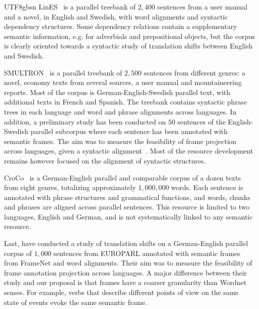 \documentclass[12pt]{book} %
\begin{document}
\begin{CJK}{UTF8}{gbsn}
LinES~\citep{ahrenberg2007lines} is a parallel treebank of $2,400$
sentences from a user manual and a novel, in English and Swedish, with
word alignments and syntactic dependency structures.
Some dependency relations contain a supplementary semantic
information, e.g. for adverbials and prepositional objects, but the
corpus is clearly oriented towards a syntactic study of translation
shifts between English and Swedish.

SMULTRON~\citep{Smultron2010} is a parallel treebank of $2,500$
sentences from different genres: a novel, economy texts from several
sources, a user manual and mountaineering reports.
Most of the corpus is German-English-Swedish parallel text, with
additional texts in French and Spanish.
The treebank contains syntactic phrase trees in each language and word
and phrase alignments across languages.
In addition, a preliminary study has been conducted on $50$ sentences
of the English-Swedish parallel subcorpus where each sentence has been
annotated with semantic frames.
The aim was to measure the feasibility of frame projection across
languages, given a syntactic alignment~\citep{Volk:Samuelsson:2007}.
Most of the resource development remains however focused on the
alignment of syntactic structures.

CroCo~\citep{vculo2008empirical} is a German-English parallel and
comparable corpus of a dozen texts from eight genres, totalizing
approximately $1,000,000$ words.
Each sentence is annotated with phrase structures and grammatical
functions, and words, chunks and phrases are aligned across parallel
sentences.
This resource is limited to two languages, English and German, and is
not systematically linked to any semantic resource.

Last, \cite{Pado:Erk:2010} have conducted a study of translation
shifts on a German-English parallel corpus of $1,000$ sentences from
EUROPARL annotated with semantic frames from FrameNet and word
alignments.
Their aim was to measure the feasibility of frame annotation
projection across languages.
A major difference between their study and our proposal is that frames
have a coarser granularity than Wordnet senses.
For example, verbs that describe different points of view on the same
state of events evoke the same semantic frame.


\end{CJK}
\end{document}
